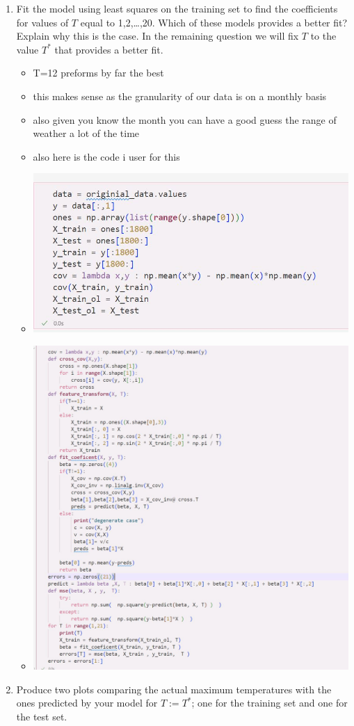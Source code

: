 \documentclass[12pt,twoside]{article}
\begin{document}
\begin{enumerate}
\begin{enumerate}
  \item Fit the model using least squares on the training set to
    find the coefficients for values of $T$ equal to 1,2,\ldots,20. Which of these models provides a better fit? Explain why this is the case. In the remaining question we will fix $T$ to the value $T^{\ast}$ that provides a better fit.
    \begin{itemize}
        \color{blue}
        \item T=12 preforms by far the best 
        \item this makes sense as the granularity of our data is on a monthly basis
        \item also given you know the month you can have a good guess the range of weather a lot of the time 
        \item also here is the code i user for this 
                \item \includegraphics[width=12cm]{homework_code/homework_11/immages/4a1.JPG}
        \item \includegraphics[width=12cm]{homework_code/homework_11/immages/4a2.JPG}
    \end{itemize}
  \item Produce two plots comparing the actual maximum temperatures with
    the ones predicted by your model for $T:=T^{\ast}$; one for the training set and one for the test set. 


\end{enumerate}
\end{enumerate}
\end{document}
